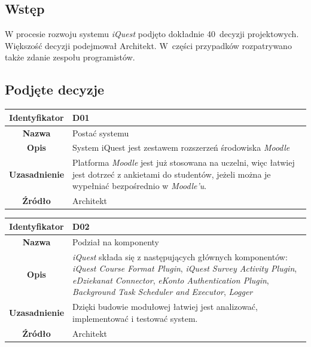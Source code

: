 \subsection{Wstęp}
\label{Chapter551}

W procesie rozwoju systemu \textit{iQuest} podjęto dokładnie 40~decyzji projektowych. Większość decyzji podejmował Architekt. W~części przypadków rozpatrywano także zdanie zespołu programistów.

\subsection{Podjęte decyzje}
\label{Chapter552}

\begin{table}[H]
\centering
\begin{tabular}{ | >{\bfseries}c | p{11cm} | }
\hline
%
Identyfikator & D01 \\ \hline
Nazwa & Postać systemu \\ \hline
Opis & System iQuest jest zestawem rozszerzeń środowiska \textit{Moodle} \\ \hline
Uzasadnienie & Platforma \textit{Moodle} jest już stosowana na uczelni, więc łatwiej jest dotrzeć z ankietami do studentów, jeżeli można je wypełniać bezpośrednio w \textit{Moodle'u}. \\ \hline
Źródło & Architekt \\ \hline
%
\end{tabular}
\end{table}

\begin{table}[H]
\centering
\begin{tabular}{ | >{\bfseries}c | p{11cm} | }
\hline
%
Identyfikator & D02 \\ \hline
Nazwa & Podział na komponenty  \\ \hline
Opis & \textit{iQuest} składa się z następujących głównych komponentów: \textit{iQuest Course Format Plugin}, \textit{iQuest Survey Activity Plugin}, \textit{eDziekanat Connector}, \textit{eKonto Authentication Plugin}, \textit{Background Task Scheduler and Executor}, \textit{Logger}  \\ \hline
Uzasadnienie & Dzięki budowie modułowej łatwiej jest analizować, implementować i testować system. \\ \hline
Źródło & Architekt \\ \hline
%
\end{tabular}
\end{table}

